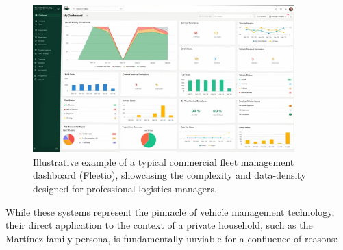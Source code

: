 \begin{figure}[h!]
    \centering
    \includegraphics[width=0.9\textwidth]{images/background/fleetio.png}
    \caption{Illustrative example of a typical commercial fleet management dashboard (Fleetio), showcasing the complexity and data-density designed for professional logistics managers.}
\end{figure}

\textgap

While these systems represent the pinnacle of vehicle management technology, their direct application to the context of a private household, such as the Martínez family persona, is fundamentally unviable for a confluence of reasons:


